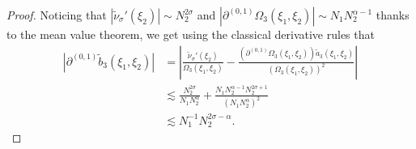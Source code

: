 \documentclass{amsart}
\theoremstyle{definition}
\theoremstyle{remark}
\numberwithin{equation}{section}
\begin{document}
\begin{proof}
  Noticing that $|\widetilde{\nu}_\sigma'(\xi_2)|\sim N_2^{2\sigma}$ and $|\partial^{(0,1)}\Omega_3(\xi_1,\xi_2)|\sim N_1N_2^{\alpha-1}$ thanks to the mean value theorem, we get using the classical derivative rules that
  \begin{align*}
    |\partial^{(0,1)}\widetilde{b}_3(\xi_1, \xi_2)| &= \left|\frac{\widetilde{\nu}_\sigma'(\xi_2)}{\Omega_3(\xi_1,\xi_2)} - \frac{\left(\partial^{(0,1)}\Omega_3(\xi_1, \xi_2)\right) \widetilde{a}_3(\xi_1,\xi_2)}{(\Omega_3(\xi_1,\xi_2))^2}\right| \\
    &\lesssim \frac{N_2^{2\sigma}}{N_1N_2^\alpha} + \frac{N_1N_2^{\alpha-1} N_2^{2\sigma+1}}{(N_1N_2^\alpha)^2}\\
    &\lesssim N_1^{-1}N_2^{2\sigma-\alpha}.
  \end{align*}
\end{proof}
\end{document}
